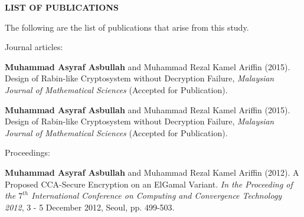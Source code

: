 \begin{center}
\normalsize{\textbf{LIST OF PUBLICATIONS}}
\end{center}



The following are the list of publications that arise from this study.

Journal articles:


\begin{hangparas}{.25in}{1}
\textbf{Muhammad Asyraf Asbullah} and Muhammad Rezal Kamel Ariffin (2015). Design of Rabin-like Cryptosystem without Decryption Failure, \textit{Malaysian Journal of Mathematical Sciences} (Accepted for Publication).

\textbf{Muhammad Asyraf Asbullah} and Muhammad Rezal Kamel Ariffin (2015). Design of Rabin-like Cryptosystem without Decryption Failure, \textit{Malaysian Journal of Mathematical Sciences} (Accepted for Publication).

\end{hangparas}

	


Proceedings:

\begin{hangparas}{.25in}{1}
 \textbf{Muhammad Asyraf Asbullah} and Muhammad Rezal Kamel Ariffin (2012). A Proposed CCA-Secure Encryption on an ElGamal Variant. \textit{In the Proceeding of the $7^{th}$ International Conference on Computing and Convergence Technology 2012}, 3 - 5 December 2012, Seoul, pp. 499-503.
\end{hangparas}



\newpage
\thispagestyle{empty}
\cleardoublepage
